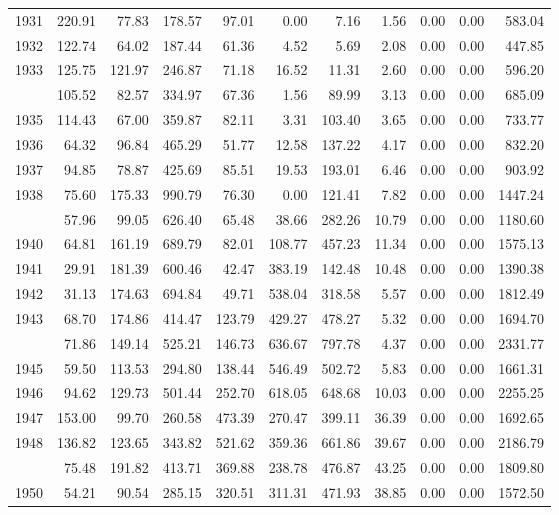 \begin{longtable}[t]{rrrrrrrrrrr}
1931 & 220.91 & 77.83 & 178.57 & 97.01 & 0.00 & 7.16 & 1.56 & 0.00 & 0.00 & 583.04\\
1932 & 122.74 & 64.02 & 187.44 & 61.36 & 4.52 & 5.69 & 2.08 & 0.00 & 0.00 & 447.85\\
1933 & 125.75 & 121.97 & 246.87 & 71.18 & 16.52 & 11.31 & 2.60 & 0.00 & 0.00 & 596.20\\
\addlinespace
1934 & 105.52 & 82.57 & 334.97 & 67.36 & 1.56 & 89.99 & 3.13 & 0.00 & 0.00 & 685.09\\
1935 & 114.43 & 67.00 & 359.87 & 82.11 & 3.31 & 103.40 & 3.65 & 0.00 & 0.00 & 733.77\\
1936 & 64.32 & 96.84 & 465.29 & 51.77 & 12.58 & 137.22 & 4.17 & 0.00 & 0.00 & 832.20\\
1937 & 94.85 & 78.87 & 425.69 & 85.51 & 19.53 & 193.01 & 6.46 & 0.00 & 0.00 & 903.92\\
1938 & 75.60 & 175.33 & 990.79 & 76.30 & 0.00 & 121.41 & 7.82 & 0.00 & 0.00 & 1447.24\\
\addlinespace
1939 & 57.96 & 99.05 & 626.40 & 65.48 & 38.66 & 282.26 & 10.79 & 0.00 & 0.00 & 1180.60\\
1940 & 64.81 & 161.19 & 689.79 & 82.01 & 108.77 & 457.23 & 11.34 & 0.00 & 0.00 & 1575.13\\
1941 & 29.91 & 181.39 & 600.46 & 42.47 & 383.19 & 142.48 & 10.48 & 0.00 & 0.00 & 1390.38\\
1942 & 31.13 & 174.63 & 694.84 & 49.71 & 538.04 & 318.58 & 5.57 & 0.00 & 0.00 & 1812.49\\
1943 & 68.70 & 174.86 & 414.47 & 123.79 & 429.27 & 478.27 & 5.32 & 0.00 & 0.00 & 1694.70\\
\addlinespace
1944 & 71.86 & 149.14 & 525.21 & 146.73 & 636.67 & 797.78 & 4.37 & 0.00 & 0.00 & 2331.77\\
1945 & 59.50 & 113.53 & 294.80 & 138.44 & 546.49 & 502.72 & 5.83 & 0.00 & 0.00 & 1661.31\\
1946 & 94.62 & 129.73 & 501.44 & 252.70 & 618.05 & 648.68 & 10.03 & 0.00 & 0.00 & 2255.25\\
1947 & 153.00 & 99.70 & 260.58 & 473.39 & 270.47 & 399.11 & 36.39 & 0.00 & 0.00 & 1692.65\\
1948 & 136.82 & 123.65 & 343.82 & 521.62 & 359.36 & 661.86 & 39.67 & 0.00 & 0.00 & 2186.79\\
\addlinespace
1949 & 75.48 & 191.82 & 413.71 & 369.88 & 238.78 & 476.87 & 43.25 & 0.00 & 0.00 & 1809.80\\
1950 & 54.21 & 90.54 & 285.15 & 320.51 & 311.31 & 471.93 & 38.85 & 0.00 & 0.00 & 1572.50\\

\end{longtable}
